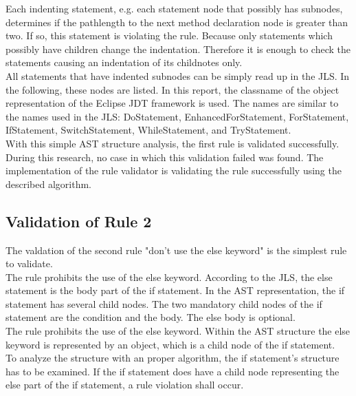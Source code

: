 Each indenting statement, e.g. each statement node that possibly has subnodes, determines if the pathlength to the next method declaration node is greater than two. If so, this statement is violating the rule. Because only statements which possibly have children change the indentation. Therefore it is enough to check the statements causing an indentation of its childnotes only.
\\

All statements that have indented subnodes can be simply read up in the \ac{JLS}. In the following, these nodes are listed. In this report, the classname of the object representation of the Eclipse \ac{JDT} framework is used. The names are similar to the names used in the \ac{JLS}: DoStatement, EnhancedForStatement, ForStatement, IfStatement, SwitchStatement, WhileStatement, and TryStatement. 
\\

With this simple \ac{AST} structure analysis, the first rule is validated successfully. During this research, no case in which this validation failed was found. The implementation of the rule validator is validating the rule successfully using the described algorithm.

\subsection*{Validation of Rule 2}
\label{evaluation:validationruletwo}
The valdation of the second rule "don’t use the else keyword" is the simplest rule to validate.
\\

The rule prohibits the use of the else keyword. According to the \ac{JLS}, the else statement is the body part of the if statement. In the \ac{AST} representation, the if statement has several child nodes. The two mandatory child nodes of the if statement are the condition and the body. The else body is optional. 
\\

The rule prohibits the use of the else keyword. Within the \ac{AST} structure the else keyword is represented by an object, which is a child node of the if statement.
\\

To analyze the structure with an proper algorithm, the if statement's structure has to be examined. If the if statement does have a child node representing the else part of the if statement, a rule violation shall occur.
\\

